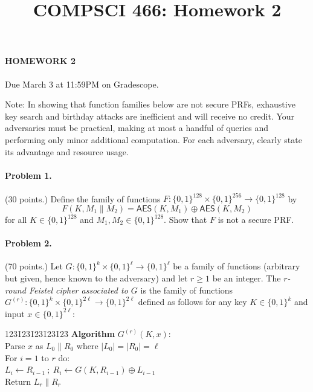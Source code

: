\documentclass[11pt]{article}
\title{COMPSCI 466: Homework 2}
\date{}
\newcommand{\bits}{\{0,1\}}
\newcommand{\next}{ \: ; \: }
\begin{document}
\thispagestyle{fancy}

\paragraph*{HOMEWORK 2} Due March 3 at 11:59PM on Gradescope.

\medskip\noindent Note: In showing that function families below are not secure PRFs, exhaustive key search and birthday attacks are inefficient and will receive no credit. Your adversaries must be practical, making at most a handful of queries and performing only minor additional computation. For each adversary, clearly state its advantage and resource usage.

\paragraph*{Problem 1.} (30 points.)
Define the family of functions $F \colon \bits^{128} \times \bits^{256} \to \bits^{128}$ by
\[
F(K, M_1 \| M_2) = \mathsf{AES}(K, M_1) \oplus \mathsf{AES}(K, M_2)
\]
for all $K \in \bits^{128}$ and $M_1, M_2 \in \bits^{128}$. Show that $F$ is not a secure PRF.

\paragraph*{Problem 2.} (70 points.)
Let $G \colon \bits^k \times \bits^{\ell} \to \bits^{\ell}$ be a family of functions (arbitrary but given, hence known to the adversary) and let $r \geq 1$ be an integer. The \emph{$r$-round Feistel cipher associated to $G$} is the family of functions $G^{(r)} \colon \bits^k \times \bits^{2\ell} \to \bits^{2\ell}$ defined as follows for any key $K \in \bits^k$ and input $x \in \bits^{2\ell}$:

\begin{center}
\begin{minipage}{2in}
\begin{tabbing}
123\=123\=123\=123\=123\=\kill
\textbf{Algorithm} $G^{(r)}(K,x)$: \\
\> Parse $x$ as $L_0 \| R_0$ where $|L_0| = |R_0| = \ell$ \\
\> For $i = 1$ to $r$ do: \\
\>\> $L_i \gets R_{i-1} \next R_i \gets G(K, R_{i-1}) \oplus L_{i-1}$ \\
\> Return $L_r \| R_r$
\end{tabbing}
\end{minipage}
\end{center}
\end{document}

